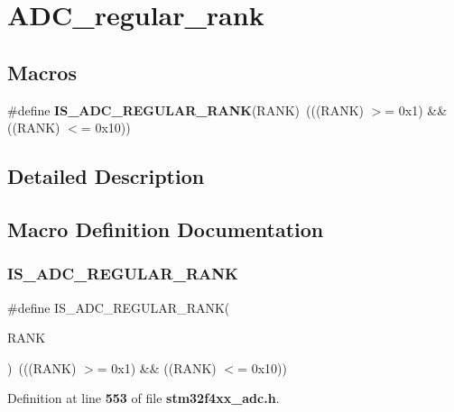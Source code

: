 \section{A\+D\+C\+\_\+regular\+\_\+rank}
\label{group__ADC__regular__rank}
\subsection*{Macros}
\begin{DoxyCompactItemize}
\item 
\#define \textbf{ I\+S\+\_\+\+A\+D\+C\+\_\+\+R\+E\+G\+U\+L\+A\+R\+\_\+\+R\+A\+NK}(R\+A\+NK)~(((R\+A\+NK) $>$= 0x1) \&\& ((\+R\+A\+N\+K) $<$= 0x10))
\end{DoxyCompactItemize}


\subsection{Detailed Description}


\subsection{Macro Definition Documentation}
\mbox{\label{group__ADC__regular__rank_ga5928a1e9315f798e27220b91f1bae7f2}} 
\subsubsection{I\+S\+\_\+\+A\+D\+C\+\_\+\+R\+E\+G\+U\+L\+A\+R\+\_\+\+R\+A\+NK}
{\footnotesize\ttfamily \#define I\+S\+\_\+\+A\+D\+C\+\_\+\+R\+E\+G\+U\+L\+A\+R\+\_\+\+R\+A\+NK(\begin{DoxyParamCaption}\item[{}]{R\+A\+NK }\end{DoxyParamCaption})~(((R\+A\+NK) $>$= 0x1) \&\& ((\+R\+A\+N\+K) $<$= 0x10))}



Definition at line \textbf{ 553} of file \textbf{ stm32f4xx\+\_\+adc.\+h}.

